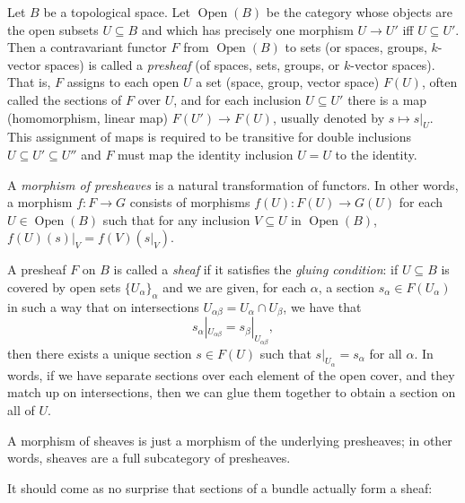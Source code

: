 \documentclass[a4paper,openany]{scrbook}
\DeclareMathOperator{\Open}{Open}
\begin{document}
\begin{defn}
Let $B$ be a topological space. Let $\Open(B)$ be the category whose objects are the open subsets $U \subseteq B$ and which has precisely one morphism $U \to U'$ iff $U \subseteq U'$. Then a contravariant functor $F$ from $\Open(B)$ to sets (or spaces, groups, $k$-vector spaces) is called a \emph{presheaf} (of spaces, sets, groups, or $k$-vector spaces). That is, $F$ assigns to each open $U$ a set (space, group, vector space) $F(U)$, often called the sections of $F$ over $U$, and for each inclusion $U \subseteq U'$ there is a map (homomorphism, linear map) $F(U') \to F(U)$, usually denoted by $s \mapsto s|_U$. This assignment of maps is required to be transitive for double inclusions $U \subseteq U' \subseteq U''$ and $F$ must map the identity inclusion $U = U$ to the identity.

A \emph{morphism of presheaves} is a natural transformation of functors. In other words, a morphism $f\colon F \to G$ consists of morphisms $f(U)\colon F(U) \to G(U)$ for each $U \in \Open(B)$ such that for any inclusion $V \subseteq U$ in $\Open(B)$, $f(U)(s)|_V = f(V)(s|_V)$.

A presheaf $F$ on $B$ is called a \emph{sheaf} if it satisfies the \emph{gluing condition}: if $U \subseteq B$ is covered by open sets $\{U_\alpha\}_\alpha$ and we are given, for each $\alpha$, a section $s_\alpha \in F(U_\alpha)$ in such a way that on intersections $U_{\alpha\beta} = U_\alpha \cap U_\beta$, we have that
\[
s_\alpha|_{U_{\alpha\beta}} = s_\beta|_{U_{\alpha\beta}},
\]
then there exists a unique section $s \in F(U)$ such that $s|_{U_\alpha} = s_\alpha$ for all $\alpha$. In words, if we have separate sections over each element of the open cover, and they match up on intersections, then we can glue them together to obtain a section on all of $U$.

A morphism of sheaves is just a morphism of the underlying presheaves; in other words, sheaves are a full subcategory of presheaves.
\end{defn}

It should come as no surprise that sections of a bundle actually form a sheaf:
\end{document}
